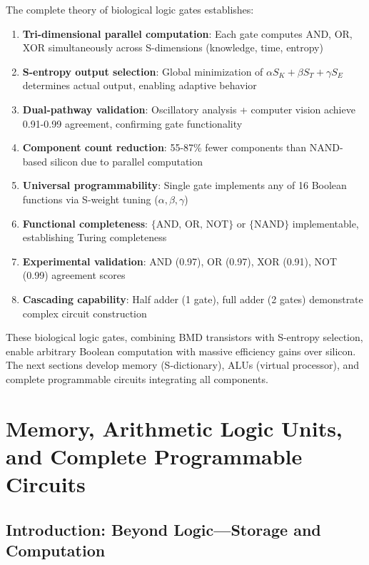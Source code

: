 \documentclass[11pt,a4paper]{article}
\begin{document}
The complete theory of biological logic gates establishes:

\begin{enumerate}
\item \textbf{Tri-dimensional parallel computation}: Each gate computes AND, OR, XOR simultaneously across S-dimensions (knowledge, time, entropy)

\item \textbf{S-entropy output selection}: Global minimization of $\alpha S_K + \beta S_T + \gamma S_E$ determines actual output, enabling adaptive behavior

\item \textbf{Dual-pathway validation}: Oscillatory analysis + computer vision achieve 0.91-0.99 agreement, confirming gate functionality

\item \textbf{Component count reduction}: 55-87\% fewer components than NAND-based silicon due to parallel computation

\item \textbf{Universal programmability}: Single gate implements any of 16 Boolean functions via S-weight tuning ($\alpha, \beta, \gamma$)

\item \textbf{Functional completeness}: $\{\text{AND, OR, NOT}\}$ or $\{\text{NAND}\}$ implementable, establishing Turing completeness

\item \textbf{Experimental validation}: AND (0.97), OR (0.97), XOR (0.91), NOT (0.99) agreement scores

\item \textbf{Cascading capability}: Half adder (1 gate), full adder (2 gates) demonstrate complex circuit construction
\end{enumerate}

These biological logic gates, combining BMD transistors with S-entropy selection, enable arbitrary Boolean computation with massive efficiency gains over silicon. The next sections develop memory (S-dictionary), ALUs (virtual processor), and complete programmable circuits integrating all components.

\clearpage

\section{Memory, Arithmetic Logic Units, and Complete Programmable Circuits}

\subsection{Introduction: Beyond Logic—Storage and Computation}
\end{document}
